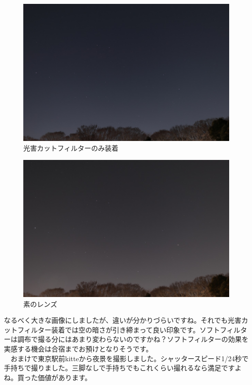 \documentclass[supernova_2023]{subfiles}
\begin{document}
\begin{figure}[H]
\begin{center}
  \includegraphics[width=14cm]{figures/Maruyama/cut.jpg}
\caption{光害カットフィルターのみ装着}
\end{center}
\end{figure}
\begin{figure}[H]
\begin{center}
  \includegraphics[width=14cm]{figures/Maruyama/normal.jpg}
\caption{素のレンズ}
\end{center}
\end{figure}
なるべく大きな画像にしましたが、違いが分かりづらいですね。それでも光害カットフィルター装着では空の暗さが引き締まって良い印象です。ソフトフィルターは調布で撮る分にはあまり変わらないのですかね？ソフトフィルターの効果を実感する機会は合宿までお預けとなりそうです。\\
　おまけで東京駅前kitteから夜景を撮影しました。シャッタースピード1/24秒で手持ちで撮りました。三脚なしで手持ちでもこれくらい撮れるなら満足ですよね。買った価値があります。
\end{document}
